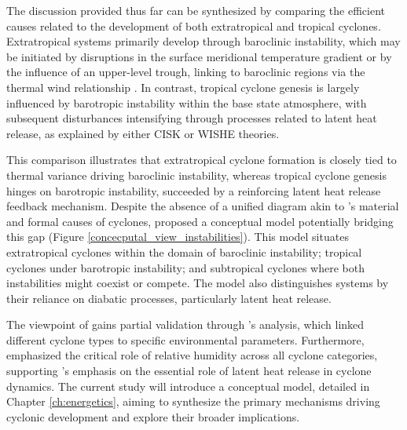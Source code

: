 The discussion provided thus far can be synthesized by comparing the efficient causes related to the development of both extratropical and tropical cyclones. Extratropical systems primarily develop through baroclinic instability, which may be initiated by disruptions in the surface meridional temperature gradient or by the influence of an upper-level trough, linking to baroclinic regions via the thermal wind relationship \citep{holton1973introduction,spiridonov2021fundamentals}. In contrast, tropical cyclone genesis is largely influenced by barotropic instability within the base state atmosphere, with subsequent disturbances intensifying through processes related to latent heat release, as explained by either CISK or WISHE theories.

This comparison illustrates that extratropical cyclone formation is closely tied to thermal variance driving baroclinic instability, whereas tropical cyclone genesis hinges on barotropic instability, succeeded by a reinforcing latent heat release feedback mechanism. Despite the absence of a unified diagram akin to \citet{hart2003cyclone}'s material and formal causes of cyclones, \citet{silva_dias_catarina_2004} proposed a conceptual model potentially bridging this gap (Figure \ref{concecputal_view_instabilities}). This model situates extratropical cyclones within the domain of baroclinic instability; tropical cyclones under barotropic instability; and subtropical cyclones where both instabilities might coexist or compete. The model also distinguishes systems by their reliance on diabatic processes, particularly latent heat release. 

The viewpoint of \citet{silva_dias_catarina_2004} gains partial validation through \citet{yanase2014parameter}'s analysis, which linked different cyclone types to specific environmental parameters. Furthermore, \citet{yanase2014parameter} emphasized the critical role of relative humidity across all cyclone categories, supporting \citet{silva_dias_catarina_2004}'s emphasis on the essential role of latent heat release in cyclone dynamics. The current study will introduce a conceptual model, detailed in Chapter \ref{ch:energetics}, aiming to synthesize the primary mechanisms driving cyclonic development and explore their broader implications.


